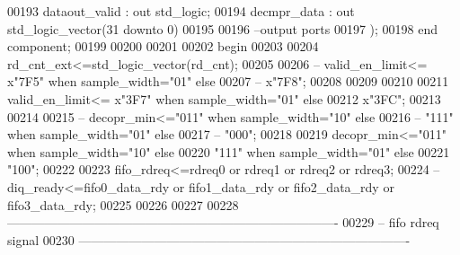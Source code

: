 \begin{DoxyCode}
00193             dataout_valid : \textcolor{keywordflow}{out} \textcolor{comment}{std\_logic};
00194             decmpr_data   : \textcolor{keywordflow}{out} \textcolor{comment}{std\_logic\_vector}(\textcolor{vhdllogic}{}\textcolor{vhdllogic}{31} \textcolor{keywordflow}{downto} \textcolor{vhdllogic}{}\textcolor{vhdllogic}{0}) 
00195 
00196 \textcolor{keyword}{        --output ports       }
00197         );
00198 \textcolor{keywordflow}{end} \textcolor{keywordflow}{component};
00199 
00200 
00201   
00202 \textcolor{vhdlkeyword}{begin}
00203   
00204   \textcolor{vhdlchar}{rd_cnt_ext}\textcolor{vhdlchar}{<=}\textcolor{comment}{std\_logic\_vector}\textcolor{vhdlchar}{(}\textcolor{vhdlchar}{rd_cnt}\textcolor{vhdlchar}{)};
00205   
00206 \textcolor{keyword}{-- valid\_en\_limit<= x"7F5" when sample\_width="01" else}
00207 \textcolor{keyword}{--                  x"7F8";}
00208 
00209                    
00210                      
00211   \textcolor{vhdlchar}{valid_en_limit}\textcolor{vhdlchar}{<=} \textcolor{vhdlchar}{x}\textcolor{vhdllogic}{"3F7"} \textcolor{keywordflow}{when} \textcolor{vhdlchar}{sample_width}\textcolor{vhdlchar}{=}\textcolor{vhdllogic}{"01"} \textcolor{keywordflow}{else}
00212                    \textcolor{vhdlchar}{x}\textcolor{vhdllogic}{"3FC"};
00213   
00214   
00215 \textcolor{keyword}{--  decopr\_min<="011" when sample\_width="10" else }
00216 \textcolor{keyword}{--              "111" when sample\_width="01" else}
00217 \textcolor{keyword}{--              "000";}
00218   
00219   \textcolor{vhdlchar}{decopr_min}\textcolor{vhdlchar}{<=}\textcolor{vhdllogic}{"011"} \textcolor{keywordflow}{when} \textcolor{vhdlchar}{sample_width}\textcolor{vhdlchar}{=}\textcolor{vhdllogic}{"10"} \textcolor{keywordflow}{else} 
00220               \textcolor{vhdllogic}{"111"} \textcolor{keywordflow}{when} \textcolor{vhdlchar}{sample_width}\textcolor{vhdlchar}{=}\textcolor{vhdllogic}{"01"} \textcolor{keywordflow}{else}
00221               \textcolor{vhdllogic}{"100"};
00222 
00223 \textcolor{vhdlchar}{fifo_rdreq}\textcolor{vhdlchar}{<=}\textcolor{vhdlchar}{rdreq0} \textcolor{keywordflow}{or} \textcolor{vhdlchar}{rdreq1} \textcolor{keywordflow}{or} \textcolor{vhdlchar}{rdreq2} \textcolor{keywordflow}{or} \textcolor{vhdlchar}{rdreq3};
00224 \textcolor{keyword}{--diq\_ready<=fifo0\_data\_rdy or fifo1\_data\_rdy or fifo2\_data\_rdy or fifo3\_data\_rdy;}
00225 
00226 
00227 
00228 \textcolor{keyword}{-------------------------------------------------------------------------------         }
00229 \textcolor{keyword}{-- fifo rdreq signal}
00230 \textcolor{keyword}{-------------------------------------------------------------------------------}

\end{DoxyCode}
